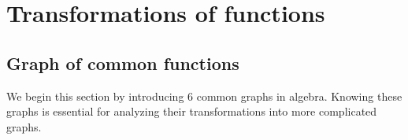 \chapter{Transformations of functions}
\section{Graph of common functions}
We begin this section by introducing 6 common graphs in algebra. Knowing these graphs is essential for analyzing their transformations into more complicated graphs.


